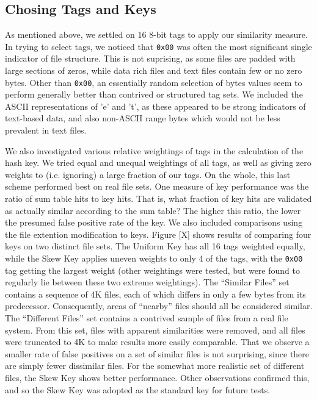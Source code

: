 \documentclass[10pt, twocolumn]{article}
\begin{document}
\subsection{Chosing Tags and Keys}

As mentioned above, we settled on 16 8-bit tags to apply our similarity measure.  In trying to select tags, we noticed that {\tt 0x00} was often the most significant single indicator of file structure.  This is not suprising, as some files are padded with large sections of zeros, while data rich files and text files contain few or no zero bytes.  Other than {\tt 0x00}, an essentially random selection of bytes values seem to perform generally better than contrived or structured tag sets.  We included the ASCII representations of 'e' and 't', as these appeared to be strong indicators of text-based data, and also non-ASCII range bytes which would not be less prevalent in text files.

We also investigated various relative weightings of tags in the calculation of the hash key.  We tried equal and unequal weightings of all tags, as well as giving zero weights to (i.e. ignoring) a large fraction of our tags.  On the whole, this last scheme performed best on real file sets. One measure of key performance was the ratio of  sum table hits to key hits.  That is, what fraction of key hits are validated as actually similar according to the sum table?  The higher this ratio, the lower the presumed false positive rate of the key.  We also included comparisons using the file extention modification to keys.  Figure [X] shows results of comparing four keys on two distinct file sets.  The Uniform Key has all 16 tags weighted equally, while the Skew Key applies uneven weights to only 4 of the tags, with the {\tt 0x00} tag getting the largest weight (other weightings were tested, but were found to regularly lie between these two extreme weightings).  The ``Similar Files'' set contains a sequence of 4K files, each of which differs in only a few bytes from its predecessor.  Consequently, areas of ``nearby'' files should all be considered similar.  The ``Different Files'' set contains a contrived sample of files from a real file system.  From this set, files with apparent similarities were removed, and all files were truncated to 4K to make results more easily comparable.  That we observe a smaller rate of false positives on a set of similar files is not surprising, since there are simply fewer dissimilar files.  For the somewhat more realistic set of different files, the Skew Key shows better performance.  Other observations confirmed this, and so the Skew Key was adopted as the standard key for future tests.
\end{document}
